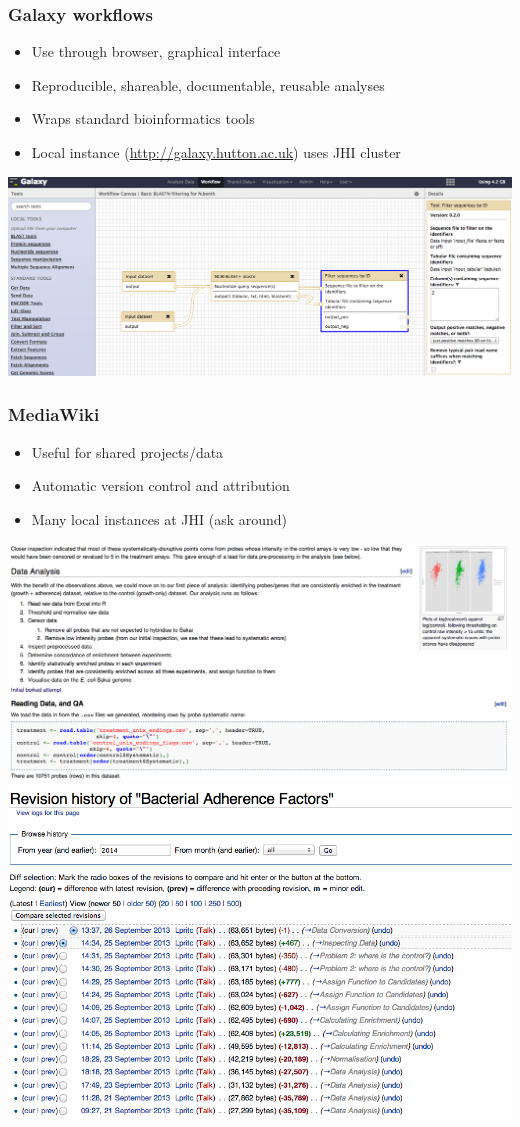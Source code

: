 \begin{frame}
  \frametitle{Galaxy workflows}
  \begin{itemize}
    \item Use through browser, graphical interface
    \item Reproducible, shareable, documentable, reusable analyses
    \item Wraps standard bioinformatics tools
    \item Local instance (\url{http://galaxy.hutton.ac.uk}) uses JHI cluster       
  \end{itemize}
  \begin{center}
    \includegraphics[width=.75\textwidth]{images/galaxy_screenshot}
  \end{center}
\end{frame}      
   
\begin{frame}
  \frametitle{MediaWiki}
  \begin{itemize}
    \item Useful for shared projects/data
    \item Automatic version control and attribution
    \item Many local instances at JHI (ask around)
  \end{itemize}
  \begin{center}
    \includegraphics[width=.4\textwidth]{images/mediawiki_after}
    \includegraphics[width=.4\textwidth]{images/mediawiki_version_control}     
  \end{center}
\end{frame}
   
